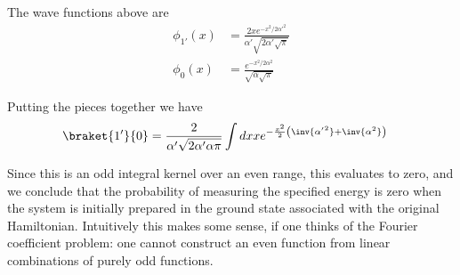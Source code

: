 {The wave functions above are
\begin{equation}\label{eqn:qmIexamPractice2008Dec:3:410}
\begin{aligned}
\phi_{1'}(x) &= \frac{ 2 x e^{-x^2/2 {\alpha'}^2 }}{ \alpha' \sqrt{ 2 \alpha' \sqrt{\pi} } } \\
\phi_{0}(x) &= \frac{ e^{-x^2/2 {\alpha}^2 } } { \sqrt{ \alpha \sqrt{\pi} } }
\end{aligned}
\end{equation}

Putting the pieces together we have
%
\begin{equation}\label{eqn:qmIexamPractice2008Dec:3:810}
\begin{aligned}
\braket{1'}{0}
&=
\frac{2 }{ \alpha' \sqrt{ 2 \alpha' \alpha \pi } }
\int dx
x e^{-\frac{x^2}{2}\left( \inv{{\alpha'}^2} + \inv{\alpha^2} \right) }
\end{aligned}
\end{equation}

Since this is an odd integral kernel over an even range, this evaluates to zero, and we conclude that the probability of measuring the specified energy is zero when the system is initially prepared in the ground state associated with the original Hamiltonian.  Intuitively this makes some sense, if one thinks of the Fourier coefficient problem: one cannot construct an even function from linear combinations of purely odd functions.
} %
